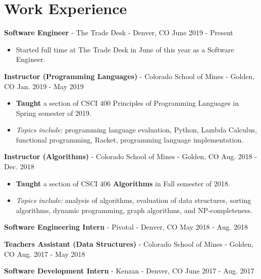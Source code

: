 \documentclass[10pt,letterpaper]{article}
\begin{document}
\section*{Work Experience}
\textbf{Software Engineer} - The Trade Desk - Denver, CO
\hfill June 2019 - Present
\begin{itemize}
    \item Started full time at The Trade Desk in June of this year as a Software
        Engineer.
\end{itemize}

\textbf{Instructor (Programming Languages)} - Colorado School of Mines - Golden, CO
\hfill Jan. 2019 - May 2019
\begin{itemize}
    \item \textbf{Taught} a section of CSCI 400 Principles of Programming
        Languages in Spring semester of 2019.
    \item \textit{Topics include:} programming language evaluation, Python,
        Lambda Calculus, functional programming, Racket, programming language
        implementation.
\end{itemize}

\textbf{Instructor (Algorithms)} - Colorado School of Mines - Golden, CO
\hfill Aug. 2018 - Dec. 2018
\begin{itemize}
    \item \textbf{Taught} a section of CSCI 406 \textbf{Algorithms} in Fall
        semester of 2018.
    \item \textit{Topics include:} analysis of algorithms, evaluation of data
        structures, sorting algorithms, dynamic programming, graph algorithms,
        and NP-completeness.
\end{itemize}

\textbf{Software Engineering Intern} - Pivotal - Denver, CO
\hfill May 2018 - Aug. 2018

\vspace{2pt}
\textbf{Teachers Assistant (Data Structures)} - Colorado School of Mines -
Golden, CO \hfill Aug. 2017 - May 2018

\vspace{2pt}
\textbf{Software Development Intern} - Kenzan - Denver, CO
\hfill June 2017 - Aug. 2017
\end{document}
